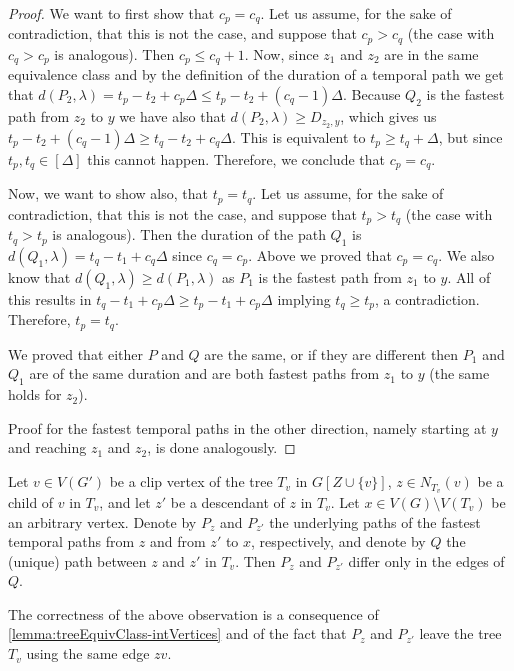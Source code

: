 \documentclass[a4paper,UKenglish,cleveref, autoref, thm-restate]{lipics-v2021}
\begin{document}
\begin{proof}
    We want to first show that $c_p = c_q$.
    Let us assume, for the sake of contradiction, that this is not the case, and suppose that $c_p > c_q$ (the case with $c_q > c_p$ is analogous).
    Then $c_p \leq c_q + 1$.
    Now, since $z_1$ and $z_2$ are in the same equivalence class and by the definition of the duration of a temporal path we get that $d(P_2, \lambda) = t_p - t_2 + c_p \Delta \leq t_p - t_2 + (c_q - 1)\Delta$. 
    Because $Q_2$ is the fastest path from $z_2$ to $y$ we have also that $d(P_2, \lambda) \geq D_{z_2,y}$, which gives us $t_p - t_2 + (c_q - 1) \Delta \geq t_q - t_2 + c_q \Delta$.
    This is equivalent to $t_p \geq t_q + \Delta$, but since $t_p, t_q \in [\Delta]$ this cannot happen.
    Therefore, we conclude that $c_p = c_q$.

    Now, we want to show also, that $t_p = t_q$.
    Let us assume, for the sake of contradiction, that this is not the case, and suppose that $t_p > t_q$ (the case with $t_q > t_p$ is analogous).
    Then the duration of the path $Q_1$ is $d(Q_1,\lambda) = t_q - t_1 + c_q \Delta$ since $c_q = c_p$.
    Above we proved that $c_p = c_q$. We also know that $d(Q_1,\lambda) \geq d(P_1,\lambda)$ as $P_1$ is the fastest path from $z_1$ to $y$. All of this results in $t_q - t_1 + c_p \Delta \geq t_p - t_1 + c_p \Delta$ implying $t_q \geq t_p$, a contradiction.
    Therefore, $t_p = t_q$.

    We proved that either $P$ and $Q$ are the same, or if they are different then $P_1$ and $Q_1$ are of the same duration and are both fastest paths from $z_1$ to $y$ (the same holds for $z_2$). 

    Proof for the fastest temporal paths in the other direction, namely starting at $y$ and reaching $z_1$ and $z_2$, is done analogously.
\end{proof}

\begin{observation}\label{obs:tree-only-neighbors}
Let $v \in V(G')$ be a clip vertex of the tree $T_v$ in $G[Z \cup \{v\}]$,
$z \in N_{T_v}(v)$ be a child of $v$ in $T_v$, and let $z'$ be a descendant of $z$ in $T_v$.
Let $x \in V(G)\setminus V(T_v)$ be an arbitrary vertex. 
Denote by $P_z$ and $P_{z'}$ the underlying paths of the fastest temporal paths from $z$ and from $z'$ to $x$, respectively,
and denote by $Q$ the (unique) path between $z$ and $z'$ in $T_v$.
Then $P_z$ and $P_{z'}$ differ only in the edges of $Q$.
\end{observation}
The correctness of the above observation is a consequence of \cref{lemma:treeEquivClass-intVertices} and of the fact that $P_z$ and $P_{z'}$ leave the tree $T_v$ using the same edge $zv$.
\end{document}
